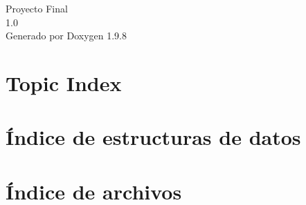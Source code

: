 \documentclass[twoside]{book}
\newcommand{\+}{\discretionary{\mbox{\scriptsize$\hookleftarrow$}}{}{}}
\newcommand{\clearemptydoublepage}{%
    \newpage{\pagestyle{empty}\cleardoublepage}%
  }
\begin{document}
  \raggedbottom
    \hypersetup{pageanchor=false,
                bookmarksnumbered=true,
                pdfencoding=unicode
               }
  \begin{titlepage}
  \vspace*{7cm}
  \begin{center}%
  {\Large Proyecto Final}\\
  [1ex]\large 1.\+0 \\
  \vspace*{1cm}
  {\large Generado por Doxygen 1.9.8}\\
  \end{center}
  \end{titlepage}
  \clearemptydoublepage
  \tableofcontents
  \clearemptydoublepage
  \hypersetup{pageanchor=true}



\chapter{Topic Index}

\chapter{Índice de estructuras de datos}

\chapter{Índice de archivos}

\end{document}
